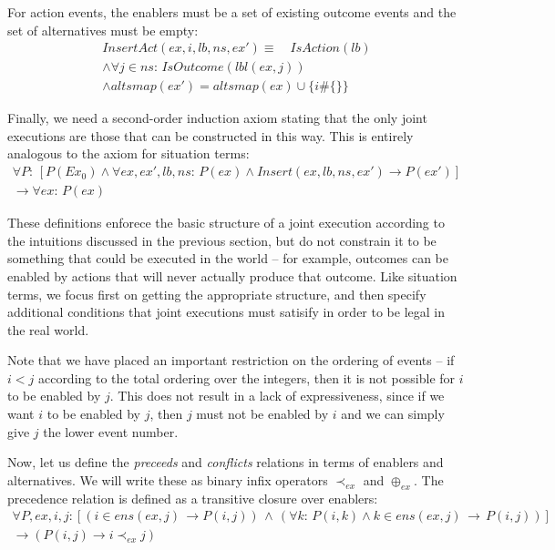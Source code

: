 For action events, the enablers must be a set of existing outcome
events and the set of alternatives must be empty:\begin{gather*}
InsertAct(ex,i,lb,ns,ex')\equiv\,\,\,\,\,\, IsAction(lb)\\
\wedge\forall j\in ns:\, IsOutcome(lbl(ex,j))\\
\wedge altsmap(ex')=altsmap(ex)\cup\{i\#\{\}\}\end{gather*}


Finally, we need a second-order induction axiom stating that the only
joint executions are those that can be constructed in this way. This
is entirely analogous to the axiom for situation terms:\begin{multline*}
\forall P:\,\left[P(Ex_{0})\wedge\forall ex,ex',lb,ns:\, P(ex)\wedge Insert(ex,lb,ns,ex')\rightarrow P(ex')\right]\\
\rightarrow\forall ex:\, P(ex)\end{multline*}


These definitions enforece the basic structure of a joint execution
according to the intuitions discussed in the previous section, but
do not constrain it to be something that could be executed in the
world -- for example, outcomes can be enabled by actions that will
never actually produce that outcome. Like situation terms, we focus
first on getting the appropriate structure, and then specify additional
conditions that joint executions must satisify in order to be legal
in the real world.

Note that we have placed an important restriction on the ordering
of events -- if $i<j$ according to the total ordering over the integers,
then it is not possible for $i$ to be enabled by $j$. This does
not result in a lack of expressiveness, since if we want $i$ to be
enabled by $j$, then $j$ must not be enabled by $i$ and we can
simply give $j$ the lower event number.

Now, let us define the \emph{preceeds} and \emph{conflicts} relations
in terms of enablers and alternatives. We will write these as binary
infix operators $\prec_{ex}$ and $\oplus_{ex}$. The precedence relation
is defined as a transitive closure over enablers:\begin{multline*}
\forall P,ex,i,j:\left[\left(i\in ens(ex,j)\,\rightarrow P(i,j)\right)\,\wedge\,\left(\forall k:\, P(i,k)\wedge k\in ens(ex,j)\,\rightarrow\, P(i,j)\right)\right]\\
\rightarrow\left(P(i,j)\rightarrow i\prec_{ex}j\right)\end{multline*}



